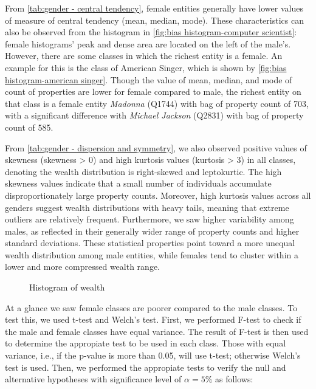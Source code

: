 From \autoref{tab:gender - central tendency}, female entities generally have lower values of measure of central tendency (mean, median, mode). These characteristics can also be observed from the histogram in \autoref{fig:bias histogram-computer scientist}: female histograms' peak and dense area are located on the left of the male's. However, there are some classes in which the richest entity is a female. An example for this is the class of American Singer, which is shown by \autoref{fig:bias histogram-american singer}. Though the value of mean, median, and mode of count of properties are lower for female compared to male, the richest entity on that class is a female entity \textit{Madonna} (Q1744) with bag of property count of 703, with a significant difference with \textit{Michael Jackson} (Q2831) with bag of property count of 585.

From \autoref{tab:gender - dispersion and symmetry}, we also observed positive values of skewness (skewness > 0) and high kurtosis values (kurtosis > 3) in all classes, denoting the wealth distribution is right-skewed and leptokurtic. The high skewness values indicate that a small number of individuals accumulate disproportionately large property counts. Moreover, high kurtosis values across all genders suggest wealth distributions with heavy tails, meaning that extreme outliers are relatively frequent. Furthermore, we saw higher variability among males, as reflected in their generally wider range of property counts and higher standard deviations. These statistical properties point toward a more unequal wealth distribution among male entities, while females tend to cluster within a lower and more compressed wealth range.

\begin{figure}[!h]
\centering 
{}


\caption{Histogram of wealth} \label{fig:Histogram of Wealth}

\end{figure}

At a glance we saw female classes are poorer compared to the male classes. To test this, we used t-test and Welch's test. First, we performed F-test to check if the male and female classes have equal variance. The result of F-test is then used to determine the appropiate test to be used in each class. Those with equal variance, i.e., if the p-value is more than 0.05, will use t-test; otherwise Welch's test is used. Then, we performed the appropiate tests to verify the null and alternative hypotheses with significance level of \(\alpha=5\%\) as follows:


